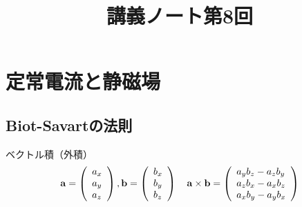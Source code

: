 \documentclass{jsarticle}
\title{講義ノート第8回}
\author{}
\date{}
\begin{document}
\maketitle

\setcounter{section}{1}

\section{定常電流と静磁場}

\setcounter{subsection}{1}

\subsection{Biot-Savartの法則}
\begin{itembox}[c]{ベクトル積（外積）}
\begin{equation*}
{\bf a}= \left(
\begin{array}{l}
a_x \\
a_y \\
a_z
\end{array}
\right)
,
{\bf b}= \left(
\begin{array}{l}
b_x \\
b_y \\
b_z
\end{array}
\right)
\quad
{\bf a} \times {\bf b} =\left(
\begin{array}{l}
a_yb_z-a_zb_y \\
a_zb_x-a_xb_z \\
a_xb_y-a_yb_x
\end{array}
\right)
\end{equation*}
\end{itembox}
\end{document}
